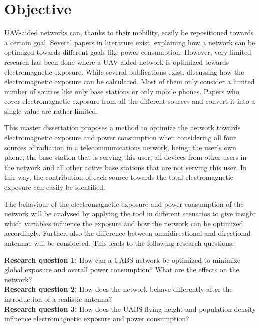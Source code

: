 \section{Objective}
\label{sec:objective}

\gls{UAV}-aided networks can, thanks to their mobility, easily be repositioned towards a certain goal. Several papers 
in literature exist, explaining how a network can be optimized towards different goals like power consumption.
However, very limited
research has been done where a \gls{UAV}-aided network is optimized towards electromagnetic exposure.
While several publications exist, discussing how the electromagnetic exposure can be calculated. 
Most of them only consider a limited number of sources like only base stations or only mobile phones.
Papers who cover electromagnetic exposure from all the different sources and convert it into a single value are rather limited.

This master dissertation proposes a method to optimize the network towards electromagnetic exposure and power consumption
when considering all four sources of radiation in a telecommunications network, being: the user's own phone, 
the base station that is serving this user, 
all devices from other users in the network and all 
other active base stations that are not serving this user. In this way, the contribution of each source towards the total 
electromagnetic exposure can easily be identified. 

The behaviour of the electromagnetic exposure and power consumption of the network will be analysed by applying the tool in different scenarios 
to give insight which variables influence the exposure and how
the network can be optimized accordingly. Further, also the difference between omnidirectional and directional antennae will 
be considered. This leads to the following research questions:

\textbf{Research question 1:} How can a \gls{UABS} network be optimized to minimize global exposure and overall power consumption? 
What are the effects on the network?\\

\textbf{Research question 2:} How does the network behave differently after the introduction of a realistic antenna?\\

\textbf{Research question 3:} How does the \gls{UABS} flying height and population density influence electromagnetic 
exposure and power consumption?\\

